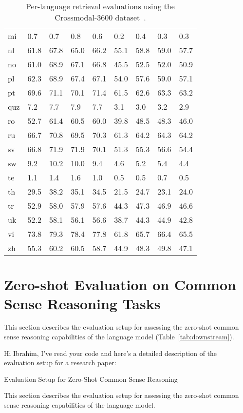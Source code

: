 \begin{table}[h]
\begin{tabularx}{\columnwidth}{@{}l|YYYY|YYYY@{}}
mi&0.7&0.7&0.8&0.6&0.2&0.4&0.3&0.3\\
nl&61.8&67.8&65.0&66.2&55.1&58.8&59.0&57.7\\
no&61.0&68.9&67.1&66.8&45.5&52.5&52.0&50.9\\
pl&62.3&68.9&67.4&67.1&54.0&57.6&59.0&57.1\\
pt&69.6&71.1&70.1&71.4&61.5&62.6&63.3&63.2\\
quz&7.2&7.7&7.9&7.7&3.1&3.0&3.2&2.9\\
ro&52.7&61.4&60.5&60.0&39.8&48.5&48.3&46.0\\
ru&66.7&70.8&69.5&70.3&61.3&64.2&64.3&64.2\\
sv&66.8&71.9&71.9&70.1&51.3&55.3&56.6&54.4\\
sw&9.2&10.2&10.0&9.4&4.6&5.2&5.4&4.4\\
te&1.1&1.4&1.6&1.0&0.5&0.5&0.7&0.5\\
th&29.5&38.2&35.1&34.5&21.5&24.7&23.1&24.0\\
tr&52.9&58.0&57.9&57.6&44.3&47.3&46.9&46.6\\
uk&52.2&58.1&56.1&56.6&38.7&44.3&44.9&42.8\\
vi&73.8&79.3&78.4&77.8&61.8&65.7&66.4&65.5\\
zh&55.3&60.2&60.5&58.7&44.9&48.3&49.8&47.1\\
 \bottomrule
    \end{tabularx}
    \caption{
    Per-language retrieval evaluations using the Crossmodal-3600 dataset~\cite{thapliyal2022crossmodal}.
    }
    \label{tab:xm3600_detailed}
\end{table}

\newpage

\section{Zero-shot Evaluation on Common Sense Reasoning Tasks}\label{app:downstream}
This section describes the evaluation setup for assessing the zero-shot common sense reasoning capabilities of the language model (Table~\ref{tab:downstream}).


Hi Ibrahim, I've read your code and here's a detailed description of the evaluation setup for a research paper:

Evaluation Setup for Zero-Shot Common Sense Reasoning

This section describes the evaluation setup for assessing the zero-shot common sense reasoning capabilities of the language model.


